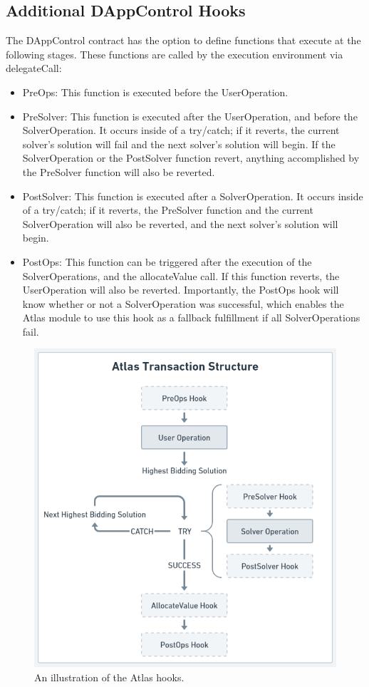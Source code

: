 \documentclass{article}
\begin{document}
\subsection{Additional DAppControl Hooks}
The DAppControl contract has the option to define functions that execute at the following stages. These functions are called by the execution environment via delegateCall:
\begin{itemize}
\item PreOps: This function is executed before the UserOperation.
\item PreSolver: This function is executed after the UserOperation, and before the SolverOperation. It occurs inside of a try/catch; if it reverts, the current solver's solution will fail and the next solver's solution will begin. If the SolverOperation or the PostSolver function revert, anything accomplished by the PreSolver function will also be reverted.
\item PostSolver: This function is executed after a SolverOperation. It occurs inside of a try/catch; if it reverts, the PreSolver function and the current SolverOperation will also be reverted, and the next solver's solution will begin.
\item PostOps: This function can be triggered after the execution of the SolverOperations, and the allocateValue call. If this function reverts, the UserOperation will also be reverted. Importantly, the PostOps hook will know whether or not a SolverOperation was successful, which enables the Atlas module to use this hook as a fallback fulfillment if all SolverOperations fail. 
\end{itemize}


\begin{figure}
\centering
\includegraphics[width=.8\linewidth]{BlackAndWhiteCallStructure.png}
\caption{\label{fig:BlackAndWhiteCallStructure.png}An illustration of the Atlas hooks.}
\end{figure}
\end{document}
